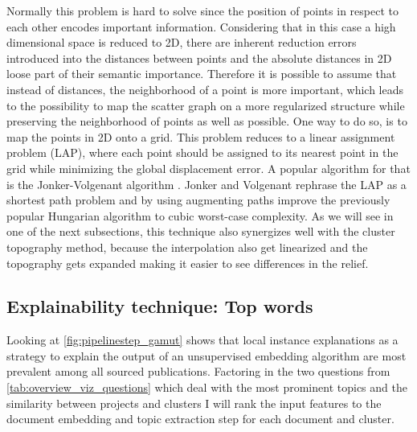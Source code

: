 Normally this problem is hard to solve since the position of points in respect to each other encodes important information. Considering that in this case a high dimensional space is reduced to 2D, there are inherent reduction errors introduced into the distances between points and the absolute distances in 2D loose part of their semantic importance. Therefore it is possible to assume that instead of distances, the neighborhood of a point is more important, which leads to the possibility to map the scatter graph on a more regularized structure while preserving the neighborhood of points as well as possible. One way to do so, is to map the points in 2D onto a grid. This problem reduces to a linear assignment problem (LAP), where each point should be assigned to its nearest point in the grid while minimizing the global displacement error. A popular algorithm for that is the Jonker-Volgenant algorithm \cite{jonkerShortestAugmentingPath1987}. Jonker and Volgenant rephrase the LAP as a shortest path problem and by using augmenting paths improve the previously popular Hungarian algorithm to cubic worst-case complexity. As we will see in one of the next subsections, this technique also synergizes well with the cluster topography method, because the interpolation also get linearized and the topography gets expanded making it easier to see differences in the relief.

\subsection{Explainability technique: Top words}

Looking at \autoref{fig:pipelinestep_gamut} shows that local instance explanations as a strategy to explain the output of an unsupervised embedding algorithm are most prevalent among all sourced publications. Factoring in the two questions from \autoref{tab:overview_viz_questions} which deal with the most prominent topics and the similarity between projects and clusters I will rank the input features to the document embedding and topic extraction step for each document and cluster. 

